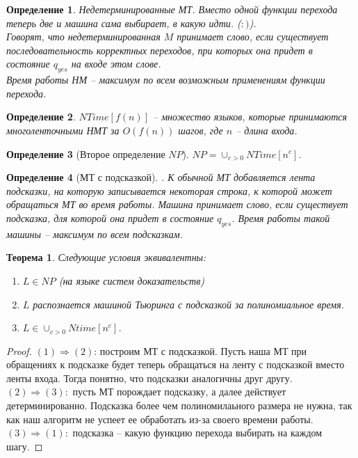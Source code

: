 \documentclass[12pt, letterpaper]{article}
\newtheorem{theorem}{Теорема}[section]
\newtheorem{defi}{Определение}[section]
\begin{document}
\begin{defi}
Недетерминированные МТ. Вместо одной функции перехода теперь две и машина сама выбирает, в какую идти. ($:)$).\\
Говорят, что недетерминированная $M$ принимает слово, если существует последовательность корректных переходов, при которых она придет в состояние $q_{yes}$ на входе этом слове. \\
Время работы НМ -- максимум по всем возможным применениям функции перехода.
\end{defi}

\begin{defi}
$NTime[f(n)]$ -- множество языков, которые принимаются многоленточными НМТ за $O(f(n))$ шагов, где $n$ -- длина входа.
\end{defi}

\begin{defi}[Второе определение $NP$]
$NP = \cup_{c>0} NTime[n^c]$.
\end{defi}

\begin{defi}[МТ с подсказкой].
К обычной МТ добавляется лента подсказки, на которую записывается некоторая строка, к которой может обращаться МТ во время работы. Машина принимает слово, если существует подсказка, для которой она придет в состояние $q_{yes}$. Время работы такой машины -- максимум по всем подсказкам.
\end{defi}

\begin{theorem}
Следующие условия эквивалентны:
\begin{enumerate}
\item $L \in NP$ (на языке систем доказательств)
\item $L$ распознается машиной Тьюринга с подсказкой за полиномиальное время.
\item $L \in \cup_{c>0} Ntime[n^c]$.
\end{enumerate}
\end{theorem}

\begin{proof}
$(1) \Rightarrow (2)$: построим МТ с подсказкой. Пусть наша МТ при обращениях к подсказке будет теперь обращаться на ленту с подсказкой вместо ленты входа. Тогда понятно, что подсказки аналогичны друг другу.\\
$(2) \Rightarrow (3):$ пусть МТ порождает подсказку, а далее действует детерминированно. Подсказка более чем полиномилаьного размера не нужна, так как наш алгоритм не успеет ее обработать из-за своего времени работы.\\
$(3) \Rightarrow (1):$ подсказка -- какую функцию перехода выбирать на каждом шагу. 
\end{proof}
\end{document}
